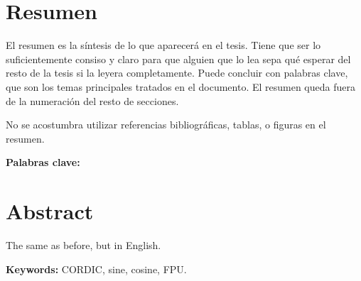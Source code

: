 \chapter*{Resumen}
\thispagestyle{empty}

El resumen es la síntesis de lo que aparecerá en el tesis. Tiene que ser lo
suficientemente consiso y claro para que alguien que lo lea sepa qué esperar
del resto de la tesis si la leyera completamente. Puede concluir con palabras
clave, que son los temas principales tratados en el documento. El resumen queda
fuera de la numeración del resto de secciones.

No se acostumbra utilizar referencias bibliográficas, tablas, o figuras
en el resumen.

\bigskip

\textbf{Palabras clave:} \scriptKeywords

\clearpage
\chapter*{Abstract}
\thispagestyle{empty}

The same as before, but in English.

\bigskip

\textbf{Keywords:} CORDIC, sine, cosine, FPU. 

\cleardoublepage

